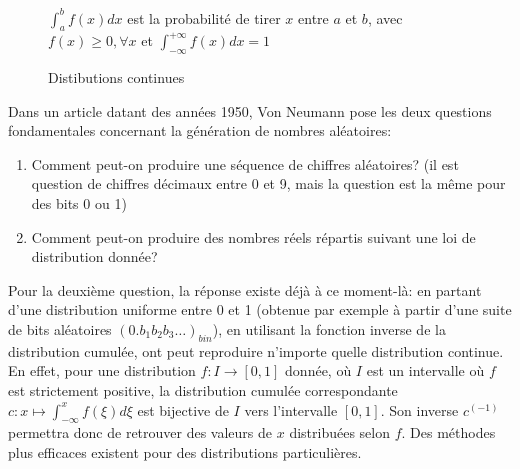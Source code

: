 \documentclass{scrartcl}
\begin{document}
\begin{figure}[h]
  \centering

\par
  $\int_a^bf(x)dx$ est la probabilité de tirer $x$ entre $a$ et $b$,
  avec $f(x)\geq0,\forall x$ et $\int_{-\infty}^{+\infty}f(x)dx=1$

  \caption{Distibutions continues}
  \label{fig:contdistr}
\end{figure}

Dans un article datant des années 1950, Von Neumann\cite{VonNeumann} pose les
deux questions fondamentales concernant la génération de nombres aléatoires:
\begin{enumerate}
\item Comment peut-on produire une séquence de chiffres aléatoires? (il est
  question de chiffres décimaux entre 0 et 9, mais la question est la même pour
  des bits 0 ou 1)
\item Comment peut-on produire des nombres réels répartis suivant une loi de
  distribution donnée?
\end{enumerate}
Pour la deuxième question, la réponse existe déjà à ce moment-là: en partant
d'une distribution uniforme entre 0 et 1 (obtenue par exemple à partir d'une
suite de bits aléatoires $(0.b_1b_2b_3\ldots)_{bin}$), en utilisant la fonction
inverse de la distribution cumulée, ont peut reproduire n'importe quelle
distribution continue. En effet, pour une distribution $f:I\rightarrow[0,1]$
donnée, où $I$ est un intervalle où $f$ est strictement positive, la
distribution cumulée correspondante $c:x\mapsto\int_{-\infty}^xf(\xi)d\xi$ est
bijective de $I$ vers l'intervalle $[0,1]$. Son inverse $c^{(-1)}$ permettra
donc de retrouver des valeurs de $x$ distribuées selon $f$. Des méthodes plus
efficaces existent pour des distributions particulières.\par\medskip
\end{document}
